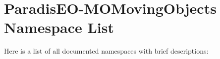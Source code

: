 \section{Paradis\-EO-MOMoving\-Objects Namespace List}
Here is a list of all documented namespaces with brief descriptions:\begin{CompactList}
\item{}
\end{CompactList}
